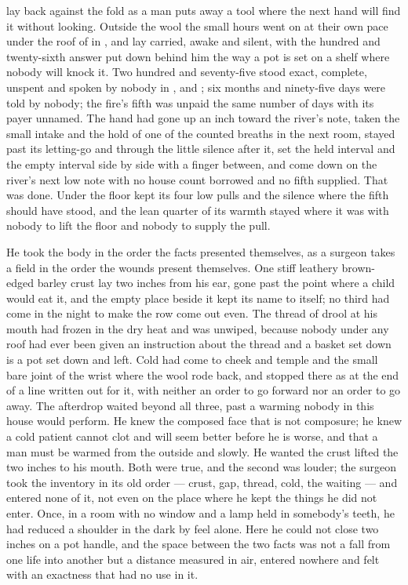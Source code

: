 
 lay back against the fold as a man puts away a tool where the next hand will find it without looking. Outside the wool the small hours went on at their own pace under the roof of  in , and  lay carried, awake and silent, with the hundred and twenty-sixth answer put down behind him the way a pot is set on a shelf where nobody will knock it. Two hundred and seventy-five stood exact, complete, unspent and spoken by nobody in ,  and ; six months and ninety-five days were told by nobody; the fire's fifth was unpaid the same number of days with its payer unnamed. The hand had gone up an inch toward the river's note, taken the small intake and the hold of one of the counted breaths in the next room, stayed past its letting-go and through the little silence after it, set the held interval and the empty interval side by side with a finger between, and come down on the river's next low note with no house count borrowed and no fifth supplied. That was done. Under the floor  kept its four low pulls and the silence where the fifth should have stood, and the lean quarter of its warmth stayed where it was with nobody to lift the floor and nobody to supply the pull.

He took the body in the order the facts presented themselves, as a surgeon takes a field in the order the wounds present themselves. One stiff leathery brown-edged barley crust lay two inches from his ear, gone past the point where a child would eat it, and the empty place beside it kept its name to itself; no third had come in the night to make the row come out even. The thread of drool at his mouth had frozen in the dry heat and was unwiped, because nobody under any roof had ever been given an instruction about the thread and a basket set down is a pot set down and left. Cold had come to cheek and temple and the small bare joint of the wrist where the wool rode back, and stopped there as at the end of a line written out for it, with neither an order to go forward nor an order to go away. The afterdrop waited beyond all three, past a warming nobody in this house would perform. He knew the composed face that is not composure; he knew a cold patient cannot clot and will seem better before he is worse, and that a man must be warmed from the outside and slowly. He wanted the crust lifted the two inches to his mouth. Both were true, and the second was louder; the surgeon took the inventory in its old order --- crust, gap, thread, cold, the waiting --- and entered none of it, not even on the place where he kept the things he did not enter. Once, in a room with no window and a lamp held in somebody's teeth, he had reduced a shoulder in the dark by feel alone. Here he could not close two inches on a pot handle, and the space between the two facts was not a fall from one life into another but a distance measured in air, entered nowhere and felt with an exactness that had no use in it.

